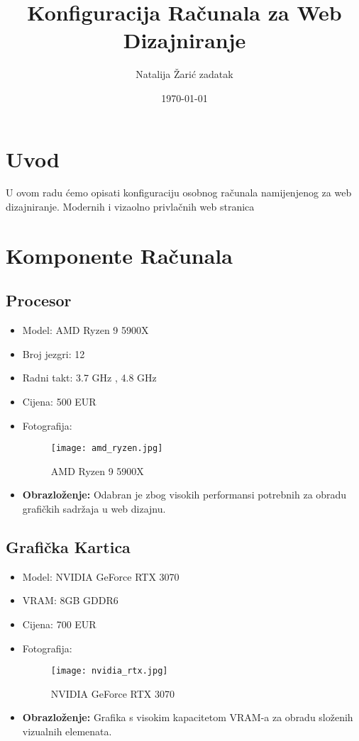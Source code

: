 \documentclass[30pt, letterpaper,utf8,a4paper]{article}
\title{Konfiguracija Računala za Web Dizajniranje}
\author{Natalija Žarić zadatak}
\date{\today}
\begin{document}
\maketitle
\newpage


\tableofcontents



\newpage


\section{Uvod}
U ovom radu ćemo opisati  konfiguraciju osobnog računala namijenjenog za web dizajniranje. Modernih i vizaolno privlačnih web stranica
\section{Komponente Računala}






\subsection{Procesor}
\begin{itemize}
    \item Model: AMD Ryzen 9 5900X
    \item Broj jezgri: 12
    \item Radni takt: 3.7 GHz , 4.8 GHz 
    \item Cijena: 500 EUR
    \item Fotografija: \begin{figure}[H]
        \centering
        \texttt{[image: amd\_ryzen.jpg]}
        \caption{AMD Ryzen 9 5900X}
    \end{figure}
    \item \textbf{Obrazloženje:} Odabran je zbog visokih performansi potrebnih za obradu grafičkih sadržaja u web dizajnu.
\end{itemize}

\subsection{Grafička Kartica}
\begin{itemize}
    \item Model: NVIDIA GeForce RTX 3070
    \item VRAM: 8GB GDDR6
    \item Cijena: 700 EUR
    \item Fotografija: \begin{figure}[H]
        \centering
        \texttt{[image: nvidia\_rtx.jpg]}
        \caption{NVIDIA GeForce RTX 3070}
    \end{figure}
    \item \textbf{Obrazloženje:} Grafika s visokim kapacitetom VRAM-a za obradu složenih vizualnih elemenata.
\end{itemize}
\end{document}
